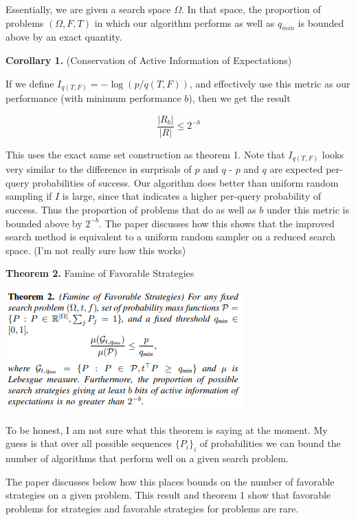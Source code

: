 \documentclass{article}
\begin{document}
Essentially, we are given a search space $\Omega$. In that space, the proportion of problems $(\Omega, F, T)$ in which our algorithm performs as well as $q_{min}$ is bounded above by an exact quantity. 

\bigskip 

\textbf{Corollary 1.} (Conservation of Active Information of Expectations)

If we define $I_{q(T,F)} = - \log(p/q(T,F))$, and effectively use this metric as our performance (with minimum performance $b$), then we get the result 

\[\frac{|R_b|}{|R|} \leq 2^{-b}\]

This uses the exact same set construction as theorem 1. Note that $I_{q(T,F)}$ looks very similar to the difference in surprisals of $p$ and $q$ - $p$ and $q$ are expected per-query probabilities of success. Our algorithm does better than uniform random sampling if $I$ is large, since that indicates a higher per-query probability of success. Thus the proportion of problems that do as well as $b$ under this metric is bounded above by $2^{-b}$. The paper discusses how this shows that the improved search method is equivalent to a uniform random sampler on a reduced search space. (I'm not really sure how this works) 

\bigskip

\textbf{Theorem 2.} Famine of Favorable Strategies
\begin{center}
    \includegraphics{FamineStrategy.PNG}
\end{center}

To be honest, I am not sure what this theorem is saying at the moment. My guess is that over all possible sequences $\{P_i\}_i$ of probabilities we can bound the number of algorithms that perform well on a given search problem. 

The paper discusses below how this places bounds on the number of favorable strategies on a given problem. This result and theorem 1 show that favorable problems for strategies and favorable strategies for problems are rare. 
\end{document}
